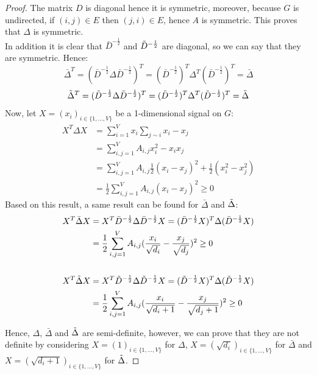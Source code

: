 \documentclass[12pt]{article}
\begin{document}
\begin{proof}\label{thm:laplacianmatrix}
    The matrix $D$ is diagonal hence it is symmetric, moreover, because $G$ is undirected, if $(i,j) \in E$ then $(j,i) \in E$, hence $A$ is symmetric. This proves that $\Delta$ is symmetric.\\
    In addition it is clear that $\bar{D}^{-\frac{1}{2}}$ and $\Tilde{D}^{-\frac{1}{2}}$ are diagonal, so we can say that they are symmetric. Hence:
    \begin{equation*}
        \bar{\Delta}^T = (\bar{D}^{-\frac{1}{2}} \Delta \bar{D}^{-\frac{1}{2}})^T = (\bar{D}^{-\frac{1}{2}})^T \Delta^T (\bar{D}^{-\frac{1}{2}})^T = \bar{\Delta}
    \end{equation*}
    \begin{equation*}
        \Tilde{\Delta}^T = (\Tilde{D}^{-\frac{1}{2}} \Delta \Tilde{D}^{-\frac{1}{2}})^T = (\Tilde{D}^{-\frac{1}{2}})^T \Delta^T (\Tilde{D}^{-\frac{1}{2}})^T = \Tilde{\Delta}
    \end{equation*}
    Now, let $X = (x_i)_{i \in \{1,...,V\}}$ be a 1-dimensional signal on $G$:
    \begin{align*}
        X^T \Delta X &= \sum_{i=1}^V x_i \sum_{j \sim i} x_i-x_j \\
                    &= \sum_{i,j =1}^V A_{i,j} x_i^2 - x_i x_j \\
                    &= \sum_{i,j = 1}^V A_{i,j} \frac{1}{2}(x_i -x_j)^2 + \frac{1}{2}(x_i^2 -x_j^2) \\
                    &= \frac{1}{2} \sum_{i,j = 1}^V A_{i,j} (x_i -x_j)^2 \geq 0
    \end{align*}
    Based on this result, a same result can be found for $\bar{\Delta}$ and $\Tilde{\Delta}$:
    \begin{align*}
     X^T \bar{\Delta} X &= X^T\bar{D}^{-\frac{1}{2}} \Delta \bar{D}^{-\frac{1}{2}}X = (\bar{D}^{-\frac{1}{2}} X)^T \Delta (\bar{D}^{-\frac{1}{2}}X) \\
        &= \frac{1}{2} \sum_{i,j = 1}^V A_{i,j} (\frac{x_i}{\sqrt{d_i}} -\frac{x_j}{\sqrt{d_j}})^2 \geq 0\\\\
        X^T \Tilde{\Delta} X &= X^T\Tilde{D}^{-\frac{1}{2}} \Delta \Tilde{D}^{-\frac{1}{2}}X = (\Tilde{D}^{-\frac{1}{2}} X)^T \Delta (\Tilde{D}^{-\frac{1}{2}}X) \\
        &= \frac{1}{2} \sum_{i,j = 1}^V A_{i,j} (\frac{x_i}{\sqrt{d_i+1}} -\frac{x_j}{\sqrt{d_j+1}})^2 \geq 0
    \end{align*}

    \noindent Hence, $\Delta$, $\bar{\Delta}$ and $\Tilde{\Delta}$ are semi-definite, however, we can prove that they are not definite by considering $X= (1)_{i \in \{1,...,V\}}$ for $\Delta$, $X = (\sqrt{d_i})_{i \in \{1,...,V\}}$ for $\bar{\Delta}$ and $X = (\sqrt{d_i +1})_{i \in \{1,...,V\}}$ for $\Tilde{\Delta}$.
\end{proof}
\end{document}
